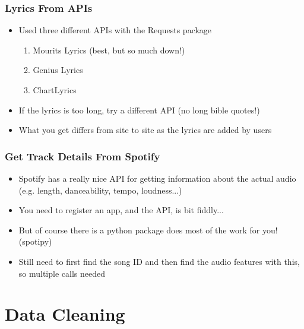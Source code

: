 \documentclass[10pt]{beamer}
\begin{document}
\begin{frame}
\frametitle{Lyrics From APIs}

\begin{itemize}
    \item Used three different APIs with the Requests package
    \begin{enumerate}
        \item Mourits Lyrics (best, but so much down!)
        \item Genius Lyrics
        \item ChartLyrics
    \end{enumerate}
    \item If the lyrics is too long, try a different API (no long bible quotes!)
    \item What you get differs from site to site as the lyrics are added by users
\end{itemize}

\end{frame}

\begin{frame}
\frametitle{Get Track Details From Spotify}

\begin{itemize}
    \item Spotify has a really nice API for getting information about
    the actual audio (e.g. length, danceability, tempo, loudness...)
    \item You need to register an app, and the API, is bit fiddly...
    \item But of course there is a python package does most of the work
    for you! (spotipy)
    \item Still need to first find the song ID and then find the audio features
    with this, so multiple calls needed
\end{itemize}

\end{frame}

\section{Data Cleaning}
\end{document}
